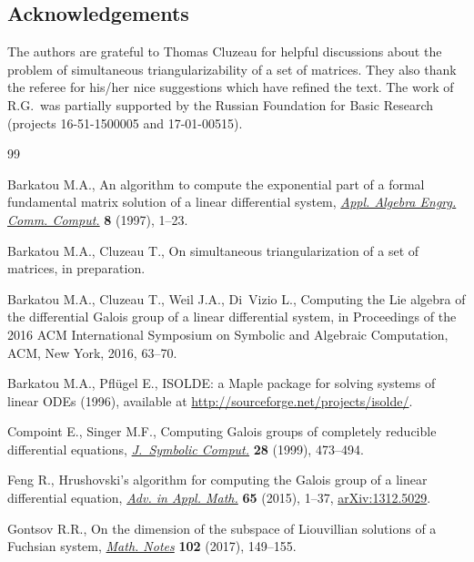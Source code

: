 \documentclass[pdftex]{sigma}
\numberwithin{equation}{section}
\begin{document}
\subsection*{Acknowledgements}

The authors are grateful to Thomas Cluzeau for helpful discussions about the problem of simultaneous triangularizability of a set of matrices. They also thank the referee for his/her nice suggestions which have refined the text. The work of R.G.\ was partially supported by the Russian Foundation for Basic Research (projects 16-51-1500005 and 17-01-00515).

\begin{thebibliography}{99}
\footnotesize\itemsep=0pt

Barkatou M.A., An algorithm to compute the exponential part of a formal
 fundamental matrix solution of a linear differential system, \href{https://doi.org/10.1007/s002000050048}{\textit{Appl.
 Algebra Engrg. Comm. Comput.}} \textbf{8} (1997), 1--23.

Barkatou M.A., Cluzeau T., On simultaneous triangularization of a set of
 matrices, in preparation.

Barkatou M.A., Cluzeau T., Weil J.A., Di~Vizio L., Computing the {L}ie algebra
 of the differential {G}alois group of a linear differential system, in
 Proceedings of the 2016 {ACM} {I}nternational {S}ymposium on {S}ymbolic and
 {A}lgebraic {C}omputation, ACM, New York, 2016, 63--70.

Barkatou M.A., Pfl\"ugel E., {ISOLDE}: a {M}aple package for solving systems of
 linear {ODE}s (1996), available at
 \url{http://sourceforge.net/projects/isolde/}.

Compoint E., Singer M.F., Computing {G}alois groups of completely reducible
 differential equations, \href{https://doi.org/10.1006/jsco.1999.0311}{\textit{J.~Symbolic Comput.}} \textbf{28} (1999),
 473--494.

Feng R., Hrushovski's algorithm for computing the {G}alois group of a linear
 differential equation, \href{https://doi.org/10.1016/j.aam.2015.01.001}{\textit{Adv. in Appl. Math.}} \textbf{65} (2015),
 1--37, \href{https://arxiv.org/abs/1312.5029}{arXiv:1312.5029}.

Gontsov R.R., On the dimension of the subspace of {L}iouvillian solutions of a
 {F}uchsian system, \href{https://doi.org/10.1134/S0001434617070173}{\textit{Math. Notes}} \textbf{102} (2017), 149--155.


\end{thebibliography}
\end{document}
